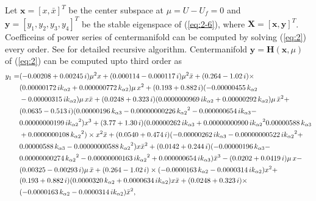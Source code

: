 \documentclass[openacc]{rsproca_new}%
\def\vec#1{\ensuremath{\mathbf{#1}}}
\newcommand{\Eref}[1]{(\ref{#1})}
\begin{document}
\begin{appendices}
\noindent Let $\vec{x}=[x,\bar x]^T$ be the center subspace at $\mu=U-U_f=0$ and $\vec y=[y_1,y_2,y_3,y_4]^T$ be the stable eigenspace of \Eref{eq:2-6}, where $\vec{X}=[\vec{x},\vec{y}]^T$. Coefficeins of power series of centermanifold can be computed by solving \Eref{eq:2} every order. See \cite{bi1999symbolic} for detailed recursive algorithm. Centermanifold $\vec y=\vec H(\vec x,\mu)$ of \Eref{eq:2} can be computed upto third order as
\begin{align}
\begin{split}
  y_1=&( - 0.00208+ 0.00245\,i ) { \mu}^{2}x+ (  0.000114-
  0.000117\,i ) { \mu}^{2}\bar {x}+ (  0.264- 1.02\,i ) \times\\
  &(  0.00000172\,i{  k_{\alpha 2}}+ 0.000000772\,{  k_{\alpha 2}} )  \mu\,{
  x}^{2}+ (  0.193+ 0.882\,i )  ( - 0.00000455\,{  k_{\alpha 2}
  }\\
  &- 0.00000315\,i{  k_{\alpha 2}} )  \mu\,x\bar {x}+(  0.0248+ 0.323\,i)
  (  0.0000000969\,i{  k_{\alpha 2}}+ 0.00000292\,{  k_{\alpha 2}}
  )  \mu\,{\bar {x}}^{2}+\\
& (  0.0635- 0.513\,i )  (
  0.00000196\,{  k_{\alpha 3}}- 0.00000000226\,{{  k_{\alpha 2}}}^{2}- 0.000000654\,i
  {  k_{\alpha 3}}-\\
& 0.00000000199\,i{{  k_{\alpha 2}}}^{2} ) {x}^{3}+   (
  3.77+ 1.30\,i )  (  0.00000262\,i{  k_{\alpha 3}}+ 0.00000000900
  \,i{{  k_{\alpha 2}}}^{2}\-0.00000588\,{  k_{\alpha 3}}\\&+ 0.0000000108\,{{  k_{\alpha 2}}}^{
  2} ) \times
  {x}^{2}\bar {x}+ (  0.0540+ 0.474\,i )  ( -
  0.00000262\,i{  k_{\alpha 3}}- 0.00000000522\,i{{  k_{\alpha 2}}}^{2}+ \\
  & 0.00000588\,
  {  k_{\alpha 3}}-0.00000000588\,{{  k_{\alpha 2}}}^{2} )x{\bar {x}}^{2}+(
  0.0142+ 0.244\,i )  ( - 0.00000196\,{  k_{\alpha 3}}-
  \\&0.00000000274\,{{  k_{\alpha 2}}}^{2}- 0.00000000163\,i{{  k_{\alpha 2}}}^{2}+
  0.000000654\,i{  k_{\alpha 3}} ) {\bar {x}}^{3}- (  0.0202+ 0.0419\,i
  )  \mu\,x-\\& (  0.00325- 0.00293\,i )  \mu\,\bar {x}+ (
  0.264- 1.02\,i ) \times  ( - 0.0000163\,{  k_{\alpha 2}}- 0.0000314\,i{
    k_{\alpha 2}} ) {x}^{2}+ \\&(  0.193+ 0.882\,i )  (
  0.0000320\,{  k_{\alpha 2}}+ 0.0000634\,i{  k_{\alpha 2}} ) x\bar {x}+(0.0248+ 0.323\,i )\times  \\&( - 0.0000163\,{  k_{\alpha 2}}- 0.0000314\,i
 {  k_{\alpha 2}} ) {\bar {x}}^{2},
\end{split}
\end{align}


\end{appendices}
\end{document}
